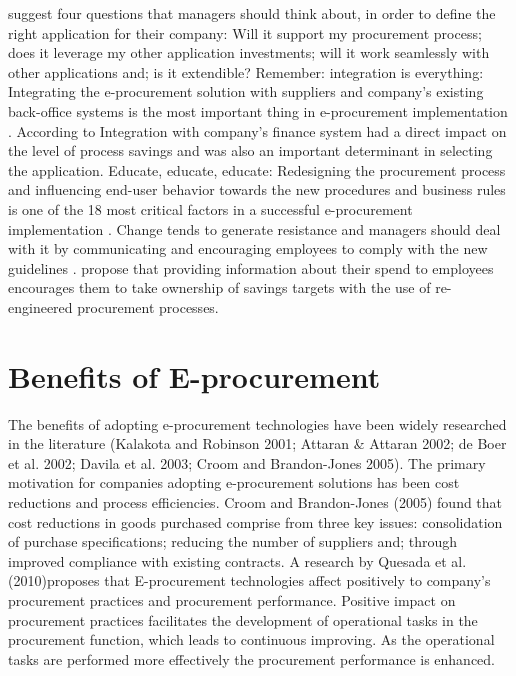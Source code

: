 \citet{kala2001} suggest four questions that managers should think about, in order to define the right application for their company: Will it support my procurement process; does it leverage my other application investments; will it work seamlessly with other applications and; is it extendible? Remember: integration is everything: Integrating the e-procurement solution with suppliers and company's existing back-office systems is the most important thing in e-procurement implementation \citep{kala2001}.  %
 According to \citet{croom2005} %
 Integration with company's finance system had a direct impact on the level of process savings and was also an important determinant in selecting the application. Educate, educate, educate: Redesigning the procurement process and influencing end-user behavior towards the new procedures and business rules is one of the 18 most critical factors in a successful e-procurement implementation \citep{angels2007}. %
Change tends to generate resistance and managers should deal with it by communicating and encouraging employees to comply with the new guidelines \citep{kala2001}. %
\citet{angels2007} %
propose that providing information about their spend to employees encourages them to take ownership of savings targets with the use of re-engineered procurement processes. 

\section{Benefits of E-procurement }
The benefits of adopting e-procurement technologies have been widely researched in the literature (Kalakota and Robinson 2001; Attaran \& Attaran 2002; de Boer et al. 2002; Davila et al. 2003; Croom and Brandon-Jones 2005). 
The primary motivation for companies adopting e-procurement solutions has been cost reductions and process efficiencies. 
Croom and Brandon-Jones (2005) found that cost reductions in goods purchased comprise from three key issues: consolidation of purchase specifications; reducing the number of suppliers and; through improved compliance with existing contracts. 
A research by Quesada et al. (2010)proposes that E-procurement technologies affect positively to company's procurement practices and procurement performance. Positive impact on procurement practices facilitates the development of operational tasks in the procurement function, which leads to continuous improving. As the operational tasks are performed more effectively the procurement performance is enhanced. 

